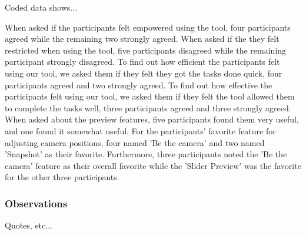 Coded data shows...

When asked if the participants felt empowered using the tool, four participants agreed while the remaining two strongly agreed. When asked if the they felt restricted when using the tool, five participants disagreed while the remaining participant strongly disagreed. To find out how efficient the participants felt using our tool, we asked them if they felt they got the tasks done quick, four participants agreed and two strongly agreed. To find out how effective the participants felt using our tool, we asked them if they felt the tool allowed them to complete the tasks well, three participants agreed and three strongly agreed.
When asked about the preview features, five participants found them very useful, and one found it somewhat useful. For the participants' favorite feature for adjusting camera positions, four named 'Be the camera' and two named 'Snapshot' as their favorite. Furthermore, three participants noted the 'Be the camera' feature as their overall favorite while the 'Slider Preview' was the favorite for the other three participants. 

\subsubsection{Observations}
Quotes, etc...
